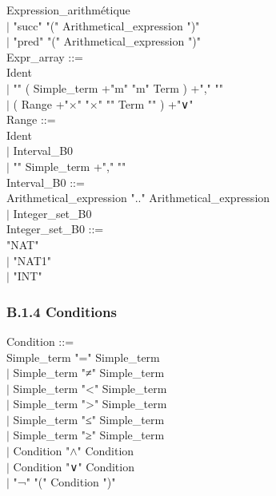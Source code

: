\documentclass[12pt,a4paper,draft]{report}
\begin{document}
{\begin{sloppypar}
Expression\_arithmétique\\
\hspace*{0.20in} $|$ "succ" "(" Arithmetical\_expression ")"\\
\hspace*{0.20in} $|$ "pred" "(" Arithmetical\_expression ")" \\
Expr\_array ::= \\
  Ident \\
\hspace*{0.20in} $|$ "{" ( Simple\_term +"m"  "m" Term ) +","  "}" \\
\hspace*{0.20in} $|$ ( Range +"$\times$" "$\times$"  "{" Term "}" ) +"∨"\\
Range ::= \\
  Ident \\
\hspace*{0.20in} $|$  Interval\_B0\\
\hspace*{0.20in} $|$ "{" Simple\_term +","  "}" \\
Interval\_B0 ::= \\
   Arithmetical\_expression  ".."  Arithmetical\_expression \\
\hspace*{0.20in} $|$  Integer\_set\_B0\\
Integer\_set\_B0 ::= \\
\hspace*{0.20in}  "NAT"\\
\hspace*{0.20in} $|$ "NAT1"\\
\hspace*{0.20in} $|$ "INT" \\
\subsubsection{B.1.4 Conditions }
Condition ::= \\
\hspace*{0.20in}   Simple\_term  "="  Simple\_term\\
\hspace*{0.20in} $|$  Simple\_term  "≠"  Simple\_term\\
\hspace*{0.20in} $|$  Simple\_term  "<"  Simple\_term  \\
\hspace*{0.20in} $|$  Simple\_term  ">"  Simple\_term  \\
\hspace*{0.20in} $|$  Simple\_term  "≤"  Simple\_term\\
\hspace*{0.20in} $|$  Simple\_term  "≥"  Simple\_term\\
\hspace*{0.20in} $|$  Condition  "$\land$"  Condition\\
\hspace*{0.20in} $|$  Condition  "∨"  Condition\\
\hspace*{0.20in} $|$ "¬" "(" Condition ")" \\
 

\end{sloppypar}}
\end{document}
